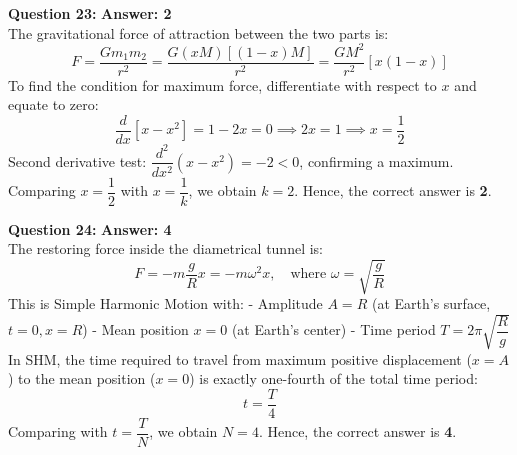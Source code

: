 \documentclass[11pt,a4paper]{article}
\begin{document}
\begin{tcolorbox}[solbox]
  \textbf{\textcolor{primaryDark}{Question 23:}} \hfill \textbf{\textcolor{l1Green}{Answer: 2}}\\
  \vspace{3pt}
  The gravitational force of attraction between the two parts is:
$$F = \frac{G m_1 m_2}{r^2} = \frac{G (x M)[(1 - x)M]}{r^2} = \frac{G M^2}{r^2} [x(1 - x)]$$
\vspace{3pt}
To find the condition for maximum force, differentiate with respect to $x$ and equate to zero:
$$\frac{d}{dx}[x - x^2] = 1 - 2x = 0 \implies 2x = 1 \implies x = \frac{1}{2}$$
\vspace{3pt}
Second derivative test: $\dfrac{d^2}{dx^2}(x - x^2) = -2 < 0$, confirming a maximum.
\vspace{3pt}
Comparing $x = \dfrac{1}{2}$ with $x = \dfrac{1}{k}$, we obtain $k = 2$.
\vspace{3pt}
Hence, the correct answer is \textbf{2}.
\end{tcolorbox}
\vspace{3pt}

\begin{tcolorbox}[solbox]
  \textbf{\textcolor{primaryDark}{Question 24:}} \hfill \textbf{\textcolor{l1Green}{Answer: 4}}\\
  \vspace{3pt}
  The restoring force inside the diametrical tunnel is:
$$F = -m\frac{g}{R}x = -m\omega^2 x, \quad \text{where } \omega = \sqrt{\frac{g}{R}}$$
\vspace{3pt}
This is Simple Harmonic Motion with:
- Amplitude $A = R$ (at Earth's surface, $t = 0, x = R$)
- Mean position $x = 0$ (at Earth's center)
- Time period $T = 2\pi \sqrt{\dfrac{R}{g}}$
\vspace{3pt}
In SHM, the time required to travel from maximum positive displacement ($x = A$) to the mean position ($x = 0$) is exactly one-fourth of the total time period:
$$t = \frac{T}{4}$$
\vspace{3pt}
Comparing with $t = \dfrac{T}{N}$, we obtain $N = 4$.
\vspace{3pt}
Hence, the correct answer is \textbf{4}.
\end{tcolorbox}
\vspace{3pt}
\end{document}
